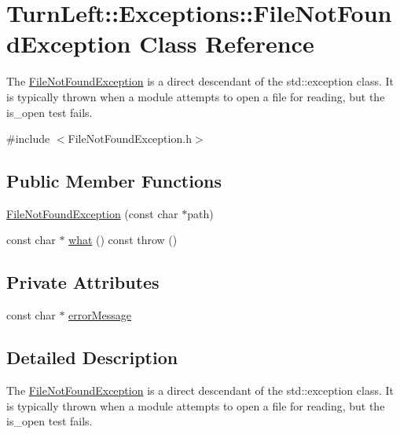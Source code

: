 \hypertarget{classTurnLeft_1_1Exceptions_1_1FileNotFoundException}{
\section{TurnLeft::Exceptions::FileNotFoundException Class Reference}
\label{classTurnLeft_1_1Exceptions_1_1FileNotFoundException}
}


The \hyperlink{classTurnLeft_1_1Exceptions_1_1FileNotFoundException}{FileNotFoundException} is a direct descendant of the std::exception class. It is typically thrown when a module attempts to open a file for reading, but the is\_\-open test fails.  




{\ttfamily \#include $<$FileNotFoundException.h$>$}

\subsection*{Public Member Functions}
\begin{DoxyCompactItemize}
\item 
\hyperlink{classTurnLeft_1_1Exceptions_1_1FileNotFoundException_a8b2a077fa8d41f2d1a79ebe556ddd4c2}{FileNotFoundException} (const char $\ast$path)
\item 
const char $\ast$ \hyperlink{classTurnLeft_1_1Exceptions_1_1FileNotFoundException_a8834fdcccd37f53b966df459d1884247}{what} () const   throw ()
\end{DoxyCompactItemize}
\subsection*{Private Attributes}
\begin{DoxyCompactItemize}
\item 
const char $\ast$ \hyperlink{classTurnLeft_1_1Exceptions_1_1FileNotFoundException_afbbbe3c619326d3da7f577fe172ddc7a}{errorMessage}
\end{DoxyCompactItemize}


\subsection{Detailed Description}
The \hyperlink{classTurnLeft_1_1Exceptions_1_1FileNotFoundException}{FileNotFoundException} is a direct descendant of the std::exception class. It is typically thrown when a module attempts to open a file for reading, but the is\_\-open test fails. 

